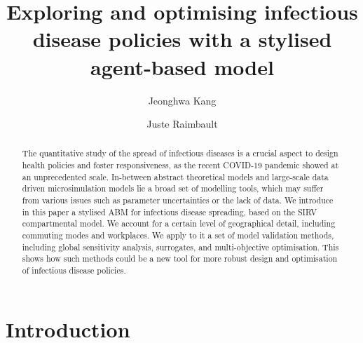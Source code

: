 \documentclass[smallextended]{svjour3}       %
\begin{document}
\title{Exploring and optimising infectious disease policies with a stylised agent-based model}


\author{Jeonghwa Kang          \and
        Juste Raimbault
}





\maketitle

\begin{abstract}
The quantitative study of the spread of infectious diseases is a crucial aspect to design health policies and foster responsiveness, as the recent COVID-19 pandemic showed at an unprecedented scale. In-between abstract theoretical models and large-scale data driven microsimulation models lie a broad set of modelling tools, which may suffer from various issues such as parameter uncertainties or the lack of data. We introduce in this paper a stylised ABM for infectious disease spreading, based on the SIRV compartmental model. We account for a certain level of geographical detail, including commuting modes and workplaces. We apply to it a set of model validation methods, including global sensitivity analysis, surrogates, and multi-objective optimisation. This shows how such methods could be a new tool for more robust design and optimisation of infectious disease policies.
\end{abstract}






\section{Introduction}
\end{document}
